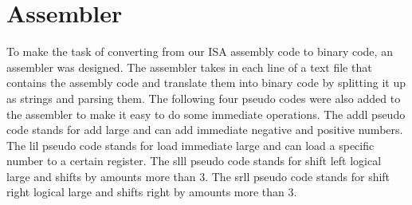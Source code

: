 \documentclass[journal]{IEEEtran}
\begin{document}
\section*{Assembler}
To make the task of converting from our ISA assembly code to binary code, an assembler was designed. The assembler takes in each line of a text file that contains the assembly code and translate them into binary code by splitting it up as strings and parsing them. The following four pseudo codes were also added to the assembler to make it easy to do some immediate operations. The addl pseudo code stands for add large and can add immediate negative and positive numbers. The lil pseudo code stands for load immediate large and can load a specific number to a certain register. The slll pseudo code stands for shift left logical large and shifts by amounts more than 3. The srll pseudo code stands for shift right logical large and shifts right by amounts more than 3.  
\end{document}
